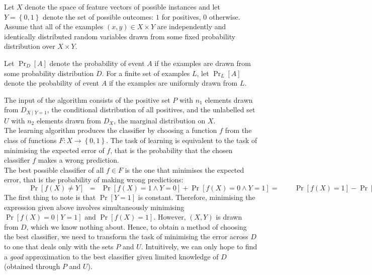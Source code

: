 \documentclass[12pt,twoside,notitlepage,amsart]{report} %
\begin{document}
	Let $X$ denote the space of feature vectors of possible instances and let $Y = \left\{ 0,1 \right\} $ denote the set of possible outcomes: $1$ for positives, $0$ otherwise. Assume that all of the examples $(x,y) \in X \times Y$ are independently and identically distributed random variables drawn from some fixed probability distribution over $ X \times Y$. 
	
	Let $\Pr_{D}[A]$ denote the probability of event $A$ if the examples are drawn from some probability distribution $D$. For a finite set of examples $L$, let $\Pr_{L}[A]$ denote the probability of event $A$ if the examples are uniformly drawn from $L$.
	
	The input of the algorithm consists of the positive set $P$ with $n_1$ elements drawn from $D_{X \mid Y=1}$, the conditional distribution of all positives, and the unlabelled set $U$ with $n_2$ elements drawn from $D_{X}$, the marginal distribution on $X$.  \\
	
	The learning algorithm produces the classifier by choosing a function $f$ from the class of functions $F: X \rightarrow \left\{ 0,1 \right\} $. The task of learning is equivalent to the task of minimising the expected error of $f$, that is the probability that the chosen classifier $f$ makes a wrong prediction. \\
	
	The best possible classifier of all $f \in F$ is the one that minimises the expected error, that is the probability of making wrong predictions:\\
	
	$ \displaystyle \phantom{=aaaa} \Pr[ f(X) \neq Y ] \phantom{a} = \phantom{a} \Pr[ f(X) = 1 \wedge Y = 0 ] + \Pr[ f(X) = 0 \wedge Y = 1] 
	
	=\phantom{aaaa} \Pr[ f(X) = 1] - \Pr[ f(X) = 1 \wedge Y = 1] + \Pr[ f(X) = 0 \wedge Y = 1] 
	
	=\phantom{aaaa} \Pr[ f(X) = 1] - \Pr[Y = 1] + \Pr[f(x) = 0 \wedge Y = 1] + \Pr[ f(X) = 0 \wedge Y = 1]
	
	=\phantom{aaaa} \Pr[ f(X) = 1] - \Pr[Y = 1] + 2 \Pr[f(x) = 0 \wedge Y = 1]
	
	= \phantom{aaaa}\Pr[ f(X) = 1] - \Pr[Y = 1] + 2 \Pr[f(x) = 0 \mid Y = 1] \Pr[Y = 1]  $ \\
	
	The first thing to note is that $\Pr[Y=1]$ is constant. Therefore, minimising the expression given above involves simultaneously minimising $\Pr[f(X) = 0 \mid Y = 1]$ and $\Pr[f(X) = 1]$. However, $(X,Y)$ is drawn from $D$, which we know nothing about. Hence, to obtain a method of choosing the best classifier, we need to transform the task of minimising the error across $D$ to one that deals only with the sets $P$ and $U$. Intuitively, we can only hope to find a \emph{good} approximation to the best classifier given limited knowledge of $D$ (obtained through $P$ and $U$). \\
	
\end{document}
